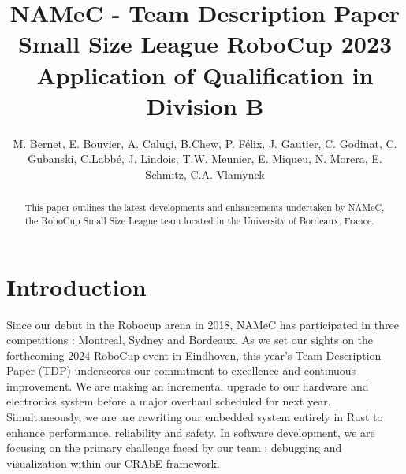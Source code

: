 \title{
  NAMeC - Team Description Paper \\
  Small Size League RoboCup 2023 \\
  Application of Qualification in Division B
}


\author{
    M. Bernet, E. Bouvier, A. Calugi, B.Chew, P. Félix, J. Gautier, C. Godinat, C. Gubanski,
    C.Labbé, J. Lindois, T.W. Meunier, E. Miqueu, N. Morera, E. Schmitz, C.A. Vlamynck
}



\maketitle

\begin{abstract}
  This paper outlines the latest developments and enhancements undertaken by NAMeC, the RoboCup Small Size League team located in the University of Bordeaux, France.
\end{abstract}

\section{Introduction}

Since our debut in the Robocup arena in 2018, NAMeC has participated in three competitions : Montreal, Sydney and Bordeaux.
As we set our sights on the forthcoming 2024 RoboCup event in Eindhoven, this year's Team Description Paper (TDP) underscores our commitment to excellence and continuous improvement.
We are making an incremental upgrade to our hardware and electronics system before a major overhaul scheduled for next year. Simultaneously, we are are rewriting our embedded system entirely in Rust to enhance performance, reliability and safety. In software development, we are focusing on the primary challenge faced by our team : debugging and visualization within our CRAbE framework.
